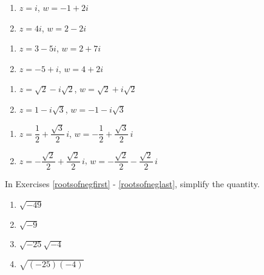 \documentclass{ximera}
\begin{document}
\begin{multicols}{2}
\begin{enumerate}
\setcounter{enumi}{\value{HW}}

\item  $z = i$, $w = -1+2i$
\item  $z = 4i$, $w = 2-2i$

\setcounter{HW}{\value{enumi}}
\end{enumerate}
\end{multicols}

\begin{multicols}{2}
\begin{enumerate}
\setcounter{enumi}{\value{HW}}

\item  $z = 3-5i$, $w = 2+7i$
\item  $z = -5+i$, $w = 4+2i$

\setcounter{HW}{\value{enumi}}
\end{enumerate}
\end{multicols}


\begin{multicols}{2}
\begin{enumerate}
\setcounter{enumi}{\value{HW}}

\item  $z = \sqrt{2} - i\sqrt{2}$, $w = \sqrt{2} + i\sqrt{2}$
\item  $z = 1 - i\sqrt{3}$, $w = -1 - i\sqrt{3}$

\setcounter{HW}{\value{enumi}}
\end{enumerate}
\end{multicols}

\begin{multicols}{2}
\begin{enumerate}
\setcounter{enumi}{\value{HW}}

\item  $z = \dfrac{1}{2} + \dfrac{\sqrt{3}}{2} \, i$, $w = -\dfrac{1}{2} + \dfrac{\sqrt{3}}{2} \,i$
\item  $z = -\dfrac{\sqrt{2}}{2} + \dfrac{\sqrt{2}}{2} \, i$, $w = -\dfrac{\sqrt{2}}{2} - \dfrac{\sqrt{2}}{2} \, i$ \label{compnumbasiclast}

\setcounter{HW}{\value{enumi}}
\end{enumerate}
\end{multicols}

In Exercises \ref{rootsofnegfirst} - \ref{rootsofneglast}, simplify the quantity.

\begin{multicols}{4}
\begin{enumerate}
\setcounter{enumi}{\value{HW}}

\item $\sqrt{-49}$ \label{rootsofnegfirst}
\item $\sqrt{-9}$
\item $\sqrt{-25}\sqrt{-4}$
\item $\sqrt{(-25)(-4)}$

\setcounter{HW}{\value{enumi}}
\end{enumerate}
\end{multicols}
\end{document}
